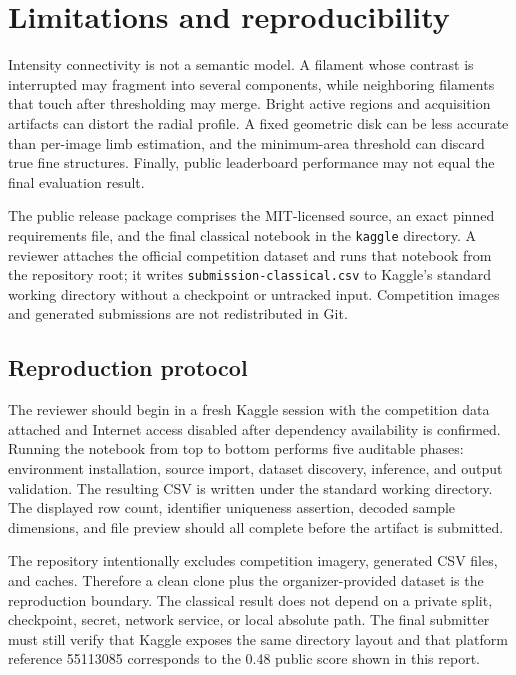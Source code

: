 \documentclass[sigconf]{acmart}
\begin{document}
\section{Limitations and reproducibility}
Intensity connectivity is not a semantic model. A filament whose contrast is
interrupted may fragment into several components, while neighboring filaments
that touch after thresholding may merge. Bright active regions and acquisition
artifacts can distort the radial profile. A fixed geometric disk can be less
accurate than per-image limb estimation, and the minimum-area threshold can
discard true fine structures. Finally, public leaderboard performance may not
equal the final evaluation result.

The public release package comprises the MIT-licensed source, an exact pinned
requirements file, and the final classical notebook in the \texttt{kaggle}
directory. A reviewer attaches the official competition dataset and runs that
notebook from the repository root; it writes \texttt{submission-classical.csv}
to Kaggle's standard working directory without a checkpoint or untracked input.
Competition images and generated submissions are not redistributed in Git.

\subsection{Reproduction protocol}
The reviewer should begin in a fresh Kaggle session with the competition data
attached and Internet access disabled after dependency availability is
confirmed. Running the notebook from top to bottom performs five auditable
phases: environment installation, source import, dataset discovery, inference,
and output validation. The resulting CSV is written under the standard working
directory. The displayed row count, identifier uniqueness assertion, decoded
sample dimensions, and file preview should all complete before the artifact is
submitted.

The repository intentionally excludes competition imagery, generated CSV files,
and caches. Therefore a clean clone plus the organizer-provided dataset is the
reproduction boundary. The classical result does not depend on a private split,
checkpoint, secret, network service, or local absolute path. The final submitter
must still verify that Kaggle exposes the same directory layout and that platform
reference 55113085 corresponds to the 0.48 public score shown in this report.
\end{document}
